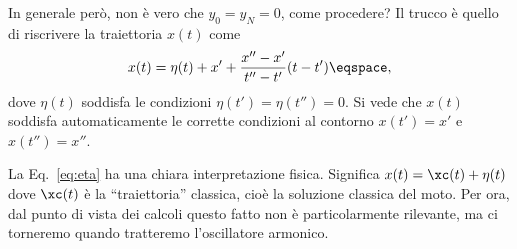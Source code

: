 In generale per\`o, non \`e vero che $y_{0} = y_{N} = 0$, come procedere?
Il trucco \`e quello di riscrivere  la traiettoria $x(t)$ come
\begin{equation}\label{eq:eta}
x(t) = \eta(t) + x' +  \frac{x'' -x'}{t''-t'} (t-t') \eqspace, 
\end{equation}
dove $\eta(t)$ soddisfa le condizioni $\eta(t') = \eta(t'') = 0$.
Si vede che $x(t)$ soddisfa automaticamente le corrette condizioni al
contorno $x(t') =x'$ e $x(t'') = x''$.

\begin{remark}

La Eq.~\eqref{eq:eta} ha una chiara interpretazione fisica.  Significa $x(t) =
\xc(t) + \eta(t) $ dove $\xc(t)$ \`e la ``traiettoria'' classica, cio\`e la
soluzione classica del moto.  Per ora, dal punto di vista dei calcoli questo
fatto non \`e particolarmente rilevante, ma ci torneremo quando tratteremo
l'oscillatore armonico.

\end{remark}

